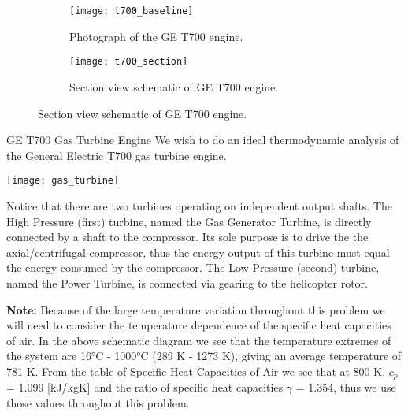 \begin{figure}[H]
\centering
\begin{subfigure}{.5\textwidth}
  \centering
  \texttt{[image: t700\_baseline]}
  \caption{Photograph of the GE T700 engine.}
  \label{fig:t700_baseline}
\end{subfigure}%
\begin{subfigure}{.5\textwidth}
  \centering
  \texttt{[image: t700\_section]}
  \caption{Section view schematic of GE T700 engine.}
  \label{fig:t700_section}
\end{subfigure}
\end{figure}

\begin{example}[label=ex:T700]{GE T700 Gas Turbine Engine}
  We wish to do an ideal thermodynamic analysis of the General Electric T700 gas turbine engine.
  \begin{center}
    \texttt{[image: gas\_turbine]}
  \end{center}
  Notice that there are two turbines operating on independent output shafts. The High Pressure (first) turbine, named the Gas Generator Turbine, is directly connected by a shaft to the compressor. Its sole purpose is to drive the the axial/centrifugal compressor, thus the energy output of this turbine must equal the energy consumed by the compressor. The Low Pressure (second) turbine, named the Power Turbine, is connected via gearing to the helicopter rotor.

  {\bf Note:} Because of the large temperature variation throughout this problem we will need to consider the temperature dependence of the specific heat capacities of air. In the above schematic diagram we see that the temperature extremes of the system are 16°C - 1000°C (289 K - 1273 K), giving an average temperature of 781 K. From the table of Specific Heat Capacities of Air we see that at 800 K, $c_p$ = 1.099 [kJ/kgK] and the ratio of specific heat capacities $\gamma$ = 1.354, thus we use those values throughout this problem.
  

\end{example}
